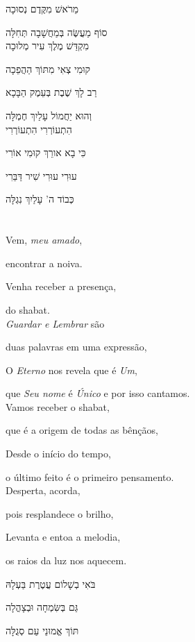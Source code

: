מֵרֹאשׁ מִקֶּדֶם נְסוּכָה

סוֹף מַעֲשֶּׂה בְּמַחֲשָׁבָה תְּחִלָּה\\[10pt]

מִקְדַּשׁ מֶלֶךְ עִיר מְלוּכָה

קוּמִי צְאִי מִתּוֹךְ הַהֲפֵכָה

רַב לָךְ שֶׁבֶת בְּעֵמֶק הַבָּכָא

וְהוּא יַחֲמוֹל עָלַיִךְ חֶמְלָּה\\[10pt]

הִתְעוֹרְרִי הִתְעוֹרְרִי

כִּי בָא אורֵךְ קוּמִי אוֹרִי

עוּרִי עוּרִי שִׁיר דַּבֵּרִי

כְּבוֹד ה' עָלַיִךְ נִגְלָּה


\movetooddpage
\raggedright

\section{}

Vem, \emph{meu amado},

encontrar a noiva.

Venha receber a presença,

do shabat.\\[10pt]

\emph{Guardar e Lembrar} são

duas palavras em uma expressão,

O \emph{Eterno} nos revela que é \emph{Um},

que \emph{Seu nome} é \emph{Único} e por isso cantamos.\\[10pt]

Vamos receber o shabat,

que é a origem de todas as bênçãos,

Desde o início do tempo,

o último feito é o primeiro pensamento.\\[10pt]

Desperta, acorda,

pois resplandece o brilho,

Levanta e entoa a melodia,

os raios da luz nos aquecem.

\movetoevenpage
\raggedleft

בֹּאִי בְשָׁלוֹם עֲטֶרֶת בַּעְלָהּ

גַּם בְּשִּׂמְחָה וּבְצָהֳלָה

תּוֹךְ אֱמוּנֵי עַם סְגֻלָּה

